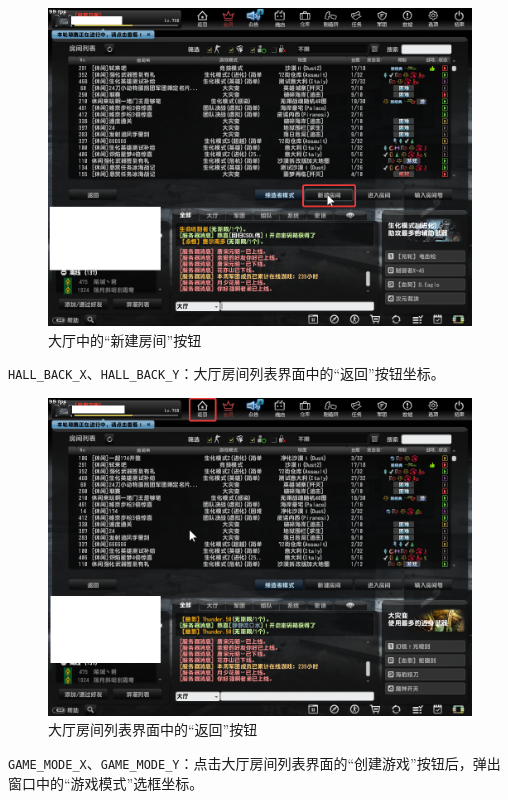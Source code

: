 \begin{figure}[H]
    \Centering
    \includegraphics[width=\textwidth]{docs/assets/create_room_0}
    \caption{大厅中的“新建房间”按钮}
\end{figure}

\lstinline{HALL_BACK_X}、\lstinline{HALL_BACK_Y}：大厅房间列表界面中的“返回”按钮坐标。

\begin{figure}[H]
    \Centering
    \includegraphics[width=\textwidth]{docs/assets/hall_back.png}
    \caption{大厅房间列表界面中的“返回”按钮}
\end{figure}

\lstinline{GAME_MODE_X}、\lstinline{GAME_MODE_Y}：点击大厅房间列表界面的“创建游戏”按钮后，弹出窗口中的“游戏模式”选框坐标。

